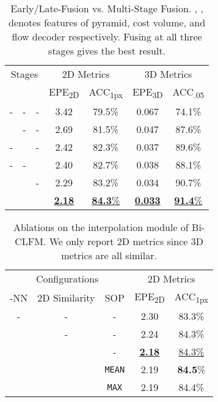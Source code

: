 \documentclass[10pt,twocolumn,letterpaper]{article}
\begin{document}
\begin{table}[t]
    \centering
    \begin{tabular}{ccc|cc|cc}
    \hline
    \multicolumn{3}{c|}{Stages} & \multicolumn{2}{c|}{2D Metrics} & \multicolumn{2}{c}{3D Metrics} \\
     &  &  & EPE\textsubscript{2D} & ACC\textsubscript{1px} & EPE\textsubscript{3D} & ACC\textsubscript{.05} \\
    \hline
    - & - & -                   & 3.42 & 79.5\% & 0.067 & 74.1\% \\
     & - & -             & 2.69 & 81.5\% & 0.047 & 87.6\% \\
    - &  & -             & 2.42 & 82.3\% & 0.037 & 89.6\% \\
    - & - &              & 2.40 & 82.7\% & 0.038 & 88.1\% \\
     &  & -       & 2.29 & 83.2\% & 0.034 & 90.7\% \\
     &  &  & \underline{\textbf{2.18}} & \underline{\textbf{84.3}\%} & \underline{\textbf{0.033}} & \underline{\textbf{91.4}\%} \\
    \hline
    \end{tabular}
    \vspace{-5pt}
    \caption{Early/Late-Fusion vs. Multi-Stage Fusion. , ,  denotes features of pyramid, cost volume, and flow decoder respectively. Fusing at all three stages gives the best result.}
    \label{tab:ablation-multi-stage}
    \vspace{-5pt}
\end{table}

\begin{table}[t]
    \centering
    \begin{tabular}{ccc|cc}
    \hline
    \multicolumn{3}{c|}{Configurations} & \multicolumn{2}{c}{2D Metrics} \\
    -NN & 2D Similarity & SOP & EPE\textsubscript{2D} & ACC\textsubscript{1px} \\
    \hline
    - & - & -                       & 2.30 & 83.3\% \\
     & - & -                   & 2.24 & 84.3\% \\
     &  & -             & \underline{\textbf{2.18}} & \underline{84.3\%} \\
     &  & \texttt{MEAN} & 2.19 & \textbf{84.5}\% \\
     &  & \texttt{MAX}  & 2.19 & 84.4\% \\
    \hline
    \end{tabular}
    \vspace{-5pt}
    \caption{Ablations on the interpolation module of Bi-CLFM. We only report 2D metrics since 3D metrics are all similar.}
    \vspace{-5pt}
    \label{tab:ablation-clfm-interpolation}
\end{table}
\end{document}
